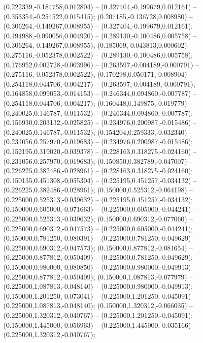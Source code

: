  (0.222339,-0.184758,0.012804) -- (0.327404,-0.199679,0.012161) -- (0.353354,-0.254522,0.015415);
 (0.207185,-0.136728,0.008980) -- (0.306264,-0.149267,0.008955) -- (0.327404,-0.199679,0.012161);
 (0.194988,-0.090056,0.004920) -- (0.289130,-0.100486,0.005758) -- (0.306264,-0.149267,0.008955);
 (0.185069,-0.043813,0.000602) -- (0.275116,-0.052378,0.002522) -- (0.289130,-0.100486,0.005758);
 (0.176952,0.002728,-0.003996) -- (0.263597,-0.004189,-0.000791) -- (0.275116,-0.052378,0.002522);
 (0.170298,0.050171,-0.008904) -- (0.254118,0.044706,-0.004217) -- (0.263597,-0.004189,-0.000791);
 (0.164858,0.099053,-0.014153) -- (0.246344,0.094860,-0.007787) -- (0.254118,0.044706,-0.004217);
 (0.160448,0.149875,-0.019779) -- (0.240025,0.146787,-0.011532) -- (0.246344,0.094860,-0.007787);
 (0.156930,0.203132,-0.025825) -- (0.234976,0.200987,-0.015486) -- (0.240025,0.146787,-0.011532);
 (0.154204,0.259333,-0.032340) -- (0.231056,0.257970,-0.019683) -- (0.234976,0.200987,-0.015486);
 (0.152195,0.319020,-0.039378) -- (0.228163,0.318275,-0.024160) -- (0.231056,0.257970,-0.019683);
 (0.150850,0.382789,-0.047007) -- (0.226225,0.382486,-0.028961) -- (0.228163,0.318275,-0.024160);
 (0.150135,0.451308,-0.055304) -- (0.225195,0.451257,-0.034132) -- (0.226225,0.382486,-0.028961);
 (0.150000,0.525312,-0.064198) -- (0.225000,0.525313,-0.039632) -- (0.225195,0.451257,-0.034132);
 (0.150000,0.605000,-0.071663) -- (0.225000,0.605000,-0.044241) -- (0.225000,0.525313,-0.039632);
 (0.150000,0.690312,-0.077060) -- (0.225000,0.690312,-0.047573) -- (0.225000,0.605000,-0.044241);
 (0.150000,0.781250,-0.080391) -- (0.225000,0.781250,-0.049629) -- (0.225000,0.690312,-0.047573);
 (0.150000,0.877812,-0.081654) -- (0.225000,0.877812,-0.050409) -- (0.225000,0.781250,-0.049629);
 (0.150000,0.980000,-0.080850) -- (0.225000,0.980000,-0.049913) -- (0.225000,0.877812,-0.050409);
 (0.150000,1.087813,-0.077979) -- (0.225000,1.087813,-0.048140) -- (0.225000,0.980000,-0.049913);
 (0.150000,1.201250,-0.073041) -- (0.225000,1.201250,-0.045091) -- (0.225000,1.087813,-0.048140);
 (0.150000,1.320312,-0.066035) -- (0.225000,1.320312,-0.040767) -- (0.225000,1.201250,-0.045091);
 (0.150000,1.445000,-0.056963) -- (0.225000,1.445000,-0.035166) -- (0.225000,1.320312,-0.040767);
